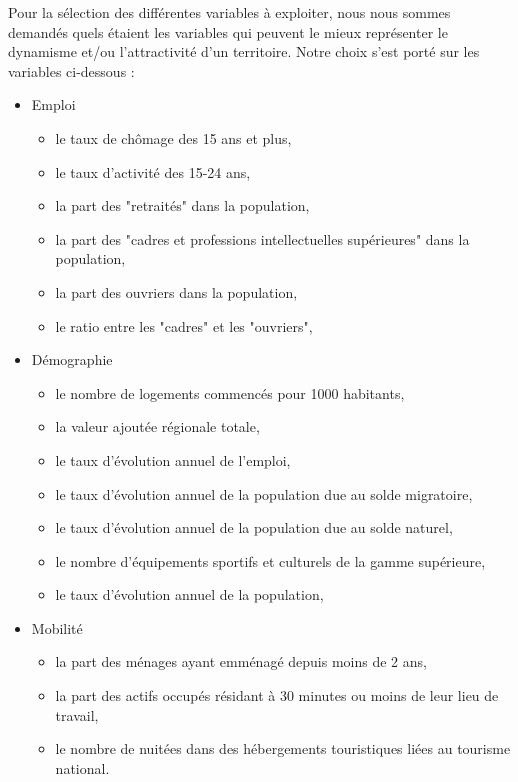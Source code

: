 \documentclass{article}
\begin{document}
Pour la sélection des différentes variables à exploiter, nous nous sommes demandés quels étaient les variables qui peuvent le mieux représenter le dynamisme et/ou l'attractivité d'un territoire. Notre choix s'est porté sur les variables ci-dessous :

\begin{itemize}[label=\textbullet]
    \item Emploi
    \begin{itemize}[label=$\circ$]
        \item le taux de chômage des 15 ans et plus, 
        \item le taux d'activité des 15-24 ans,
        \item la part des "retraités" dans la population,
        \item la part des "cadres et professions intellectuelles supérieures" dans la population,
        \item la part des ouvriers dans la population,
        \item le ratio entre les "cadres" et les "ouvriers",
    \end{itemize}
    \item Démographie
    \begin{itemize}[label=$\circ$]
        \item le nombre de logements commencés pour 1000 habitants, 
        \item la valeur ajoutée régionale totale, 
        \item le taux d'évolution annuel de l'emploi, 
        \item le taux d'évolution annuel de la population due au solde migratoire, 
        \item le taux d'évolution annuel de la population due au solde naturel, 
        \item le nombre d'équipements sportifs et culturels de la gamme supérieure, 
        \item le taux d'évolution annuel de la population, 
    \end{itemize}
    \item Mobilité
    \begin{itemize}[label=$\circ$]
        \item la part des ménages ayant emménagé depuis moins de 2 ans,
        \item la part des actifs occupés résidant à 30 minutes ou moins de leur lieu de travail,
        \item le nombre de nuitées dans des hébergements touristiques liées au tourisme national.
    \end{itemize}
\end{itemize}
\end{document}
